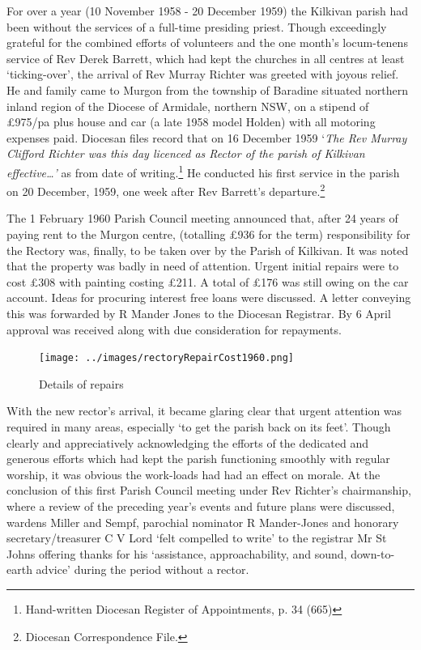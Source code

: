 For over a year (10 November 1958 - 20 December 1959) the Kilkivan parish had been without the services of a full-time presiding priest. Though exceedingly grateful for the combined efforts of volunteers and the one month's locum-tenens service of Rev Derek Barrett, which had kept the churches in all centres at least `ticking-over', the arrival of Rev Murray Richter was greeted with joyous relief. He and family came to Murgon from the township of Baradine situated northern inland region of the Diocese of Armidale, northern NSW, on a stipend of \pounds975/pa plus house and car (a late 1958 model Holden) with all motoring expenses paid. Diocesan files record that on 16 December 1959 `\emph{The Rev Murray Clifford Richter was this day licenced as Rector of the parish of Kilkivan effective\ldots'} as from date of writing.\footnote{Hand-written Diocesan Register of Appointments, p. 34 (665)} He conducted his first service in the parish on 20 December, 1959, one week after Rev Barrett's departure.\footnote{Diocesan Correspondence File.}


The 1 February 1960 Parish Council meeting announced that, after 24 years of paying rent to the Murgon centre, (totalling \pounds936 for the term) responsibility for the Rectory was, finally, to be taken over by the Parish of Kilkivan. It was noted that the property was badly in need of attention. Urgent initial repairs were to cost \pounds308 with painting costing \pounds211. A total of \pounds176 was still owing on the car account. Ideas for procuring interest free loans were discussed. A letter conveying this was forwarded by R Mander Jones to the Diocesan Registrar. By 6 April approval was received along with due consideration for repayments.









\begin{figure}
\begin{center}
\texttt{[image: ../images/rectoryRepairCost1960.png]}
\caption{Details of repairs}
\end{center}
\end{figure}




With the new rector's arrival, it became glaring clear that urgent attention was required in many areas, especially `to get the parish back on its feet'. Though clearly and appreciatively acknowledging the efforts of the dedicated and generous efforts which had kept the parish functioning smoothly with regular worship, it was obvious the work-loads had had an effect on morale. At the conclusion of this first Parish Council meeting under Rev Richter's chairmanship, where a review of the preceding year's events and future plans were discussed, wardens Miller and Sempf, parochial nominator R Mander-Jones and honorary secretary/treasurer C V Lord `felt compelled to write' to the registrar Mr St Johns offering thanks for his `assistance, approachability, and sound, down-to-earth advice' during the period without a rector.



